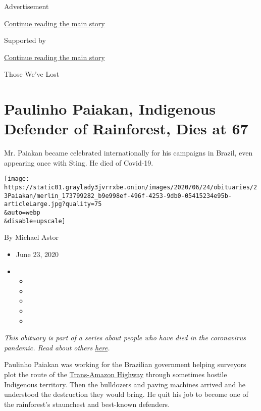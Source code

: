 Advertisement

\protect\hyperlink{after-top}{Continue reading the main story}

Supported by

\protect\hyperlink{after-sponsor}{Continue reading the main story}

Those We've Lost

\hypertarget{paulinho-paiakan-indigenous-defender-of-rainforest-dies-at-67}{%
\section{Paulinho Paiakan, Indigenous Defender of Rainforest, Dies at
67}\label{paulinho-paiakan-indigenous-defender-of-rainforest-dies-at-67}}

Mr. Paiakan became celebrated internationally for his campaigns in
Brazil, even appearing once with Sting. He died of Covid-19.

\texttt{[image: https://static01.graylady3jvrrxbe.onion/images/2020/06/24/obituaries/23Paiakan/merlin\_173799282\_b9e998ef-496f-4253-9db0-05415234e95b-articleLarge.jpg?quality=75\\\&auto=webp\\\&disable=upscale]}

By Michael Astor

\begin{itemize}
\item
  June 23, 2020
\item
  \begin{itemize}
  \item
  \item
  \item
  \item
  \item
  \end{itemize}
\end{itemize}

\emph{This obituary is part of a series about people who have died in
the coronavirus pandemic. Read about others}
\href{https://www.nytimes3xbfgragh.onion/interactive/2020/obituaries/people-died-coronavirus-obituaries.html}{\emph{here}}\emph{.}

Paulinho Paiakan was working for the Brazilian government helping
surveyors plot the route of the
\href{https://www.youtube.com/watch?v=pDssyllVegw}{Trans-Amazon Highway}
through sometimes hostile Indigenous territory. Then the bulldozers and
paving machines arrived and he understood the destruction they would
bring. He quit his job to become one of the rainforest's staunchest and
best-known defenders.

